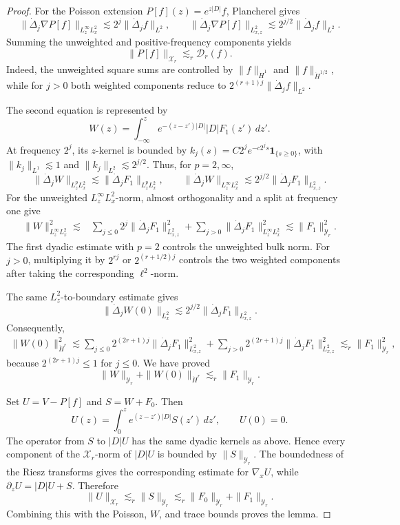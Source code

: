 \documentclass[12pt]{amsart}
\theoremstyle{remark}
\theoremstyle{definition}
\numberwithin{equation}{section}
\begin{document}
\begin{proof}
For the Poisson extension \(P[f](z)=e^{z|D|}f\), Plancherel gives
\[
 \|\dot\Delta_j\nabla P[f]\|_{L^\infty_zL^2_x}
 \lesssim2^j\|\dot\Delta_jf\|_{L^2},\qquad
 \|\dot\Delta_j\nabla P[f]\|_{L^2_{x,z}}
 \lesssim2^{j/2}\|\dot\Delta_jf\|_{L^2}.
\]
Summing the unweighted and positive-frequency components yields
\[
 \|P[f]\|_{\mathcal X_r}\lesssim_r\mathcal D_r(f).
\]
Indeed, the unweighted square sums are controlled by
\(\|f\|_{\dot H^1}\) and \(\|f\|_{\dot H^{1/2}}\), while for \(j>0\)
both weighted components reduce to
\(2^{(r+1)j}\|\dot\Delta_jf\|_{L^2}\).

The second equation is represented by
\[
 W(z)=\int_{-\infty}^z e^{-(z-z')|D|}|D|F_1(z')\,dz'.
\]
At frequency \(2^j\), its \(z\)-kernel is bounded by
\(k_j(s)=C2^je^{-c2^js}\mathbf1_{\{s\geq0\}}\), with
\(\|k_j\|_{L^1}\lesssim1\) and \(\|k_j\|_{L^2}\lesssim2^{j/2}\).
Thus, for \(p=2,\infty\),
\[
 \|\dot\Delta_jW\|_{L^p_zL^2_x}\lesssim
 \|\dot\Delta_jF_1\|_{L^p_zL^2_x},\qquad
 \|\dot\Delta_jW\|_{L^\infty_zL^2_x}\lesssim
 2^{j/2}\|\dot\Delta_jF_1\|_{L^2_{x,z}}.
\]
For the unweighted \(L^\infty_zL^2_x\)-norm, almost orthogonality and a
split at frequency one give
\begin{align*}
 \|W\|_{L^\infty_zL^2_x}^2
 \lesssim{}&
 \sum_{j\leq0}2^j\|\dot\Delta_jF_1\|_{L^2_{x,z}}^2
 +\sum_{j>0}\|\dot\Delta_jF_1\|_{L^\infty_zL^2_x}^2
 \lesssim \|F_1\|_{\mathcal Y_r}^2.
\end{align*}
The first dyadic estimate with \(p=2\) controls the unweighted bulk
norm.  For \(j>0\), multiplying it by \(2^{rj}\) or
\(2^{(r+1/2)j}\) controls the two weighted components after taking the
corresponding \(\ell^2\)-norm.

The same \(L^2_z\)-to-boundary estimate gives
\[
 \|\dot\Delta_jW(0)\|_{L^2_x}\lesssim
 2^{j/2}\|\dot\Delta_jF_1\|_{L^2_{x,z}}.
\]
Consequently,
\begin{align*}
 \|W(0)\|_{\dot H^r}^2\lesssim \sum_{j\leq0}2^{(2r+1)j}\|\dot\Delta_jF_1\|_{L^2_{x,z}}^2
+\sum_{j>0}2^{(2r+1)j}\|\dot\Delta_jF_1\|_{L^2_{x,z}}^2\lesssim_r\|F_1\|_{\mathcal Y_r}^2,
\end{align*}
because \(2^{(2r+1)j}\leq1\) for \(j\leq0\).  We have proved
\[
 \|W\|_{\mathcal Y_r}+\|W(0)\|_{\dot H^r}
 \lesssim_r\|F_1\|_{\mathcal Y_r}.
\]

Set \(U=V-P[f]\) and \(S=W+F_0\).  Then
\[
 U(z)=\int_0^z e^{(z-z')|D|}S(z')\,dz',\qquad U(0)=0.
\]
The operator from \(S\) to \(|D|U\) has the same dyadic kernels as
above. Hence every component of the \(\mathcal X_r\)-norm of \(|D|U\)
is bounded by \(\|S\|_{\mathcal Y_r}\). The boundedness of the Riesz
transforms gives the corresponding estimate for \(\nabla_xU\), while
\(\partial_zU=|D|U+S\). Therefore
\[
 \|U\|_{\mathcal X_r}\lesssim_r\|S\|_{\mathcal Y_r}  \lesssim_r\|F_0\|_{\mathcal Y_r}+\|F_1\|_{\mathcal Y_r}.
\]
Combining this with the Poisson, \(W\), and trace bounds proves the lemma.
\end{proof}
\end{document}
